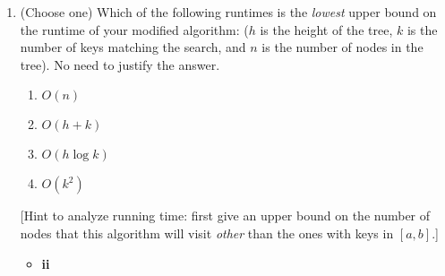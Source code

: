 \documentclass[letterpaper,11pt]{article}
\begin{document}
\begin{enumerate}
\begin{enumerate}
\begin{itemize}
\begin{itemize}
                        This is correct by they induction hypothesis and will
                        move the recursive calls in the correct direction of
                        higher values. 
                    \item Case 3: the key of root satisfies $b < root.key$. In 
                        this case the only code triggered is a recursive call
                        on $root.left$. This is correct by induction hypothesis
                        and moves the recursive call in the correct direction
                        of lower values. 
                \end{itemize}
        \end{itemize}

    \item (Choose one) Which of the following runtimes is the \emph{lowest} upper bound on the runtime of your modified algorithm: ($h$ is the height of the tree, $k$ is the number of keys matching the search, and $n$ is the number of nodes in the tree). No need to justify the answer.
    \begin{enumerate}
        \item $O(n)$
        \item $O(h+k)$
        \item $O(h\log k)$
        \item $O(k^2)$
    \end{enumerate}
    
    [Hint to analyze running time: first give an upper bound on the number of nodes that this algorithm will visit \textit{other} than the ones with keys in $[a,b]$.]
    \begin{itemize}
        \color{teal}
        \item \textbf{ii}
    \end{itemize}
\end{enumerate}


    

\end{enumerate}
\end{document}
